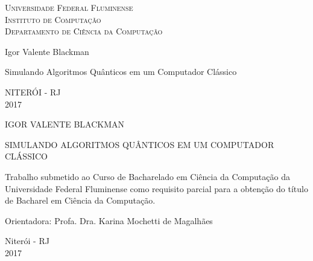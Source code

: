 \documentclass[a4paper, 12pt, oneside]{book}
\def\titulo{Simulando Algoritmos Quânticos em um
Computador Clássico}
\def\nome{Igor Valente Blackman}
\def\ano{2017}
\begin{document}

\begin{titlepage}
  \begin{center}
    \Large{\textsc{Universidade Federal Fluminense} \\
           \textsc{Instituto de Computação} \\ 
           \textsc{Departamento de Ciência da Computação} 
          }
    \par\vfill
    \LARGE{\nome}
    \par\vfill
    \LARGE{\titulo}
    \par\vfill
    \Large{NITERÓI - RJ \\
    \ano}
  \end{center}
\end{titlepage}

\setcounter{page}{2}


\begin{center}

\MakeUppercase{\nome}

\vfill

\MakeUppercase{\titulo}

\vspace{3.0cm}

\begin{flushright}
\begin{minipage}{0.50\textwidth}

Trabalho submetido ao Curso de Bacharelado em Ciência da Computação da Universidade Federal Fluminense como requisito parcial para a obtenção do título de Bacharel em Ciência da Computação.

\end{minipage}
\end{flushright}

\vspace{3.0cm}

Orientadora: Profa. Dra. Karina Mochetti de Magalhães

\vfill

Niterói - RJ \\
\ano

\end{center}

\newpage

\end{document}
